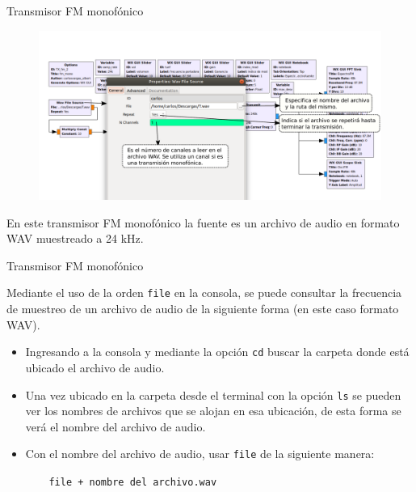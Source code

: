 \begin{frame}{Transmisor FM monofónico}

\begin{figure}[H]
\centering
\vspace{-3mm}
\includegraphics[width=\textwidth]{parte3/lab11/pdf/lab11_4.pdf}
\end{figure}

En este transmisor FM monofónico la fuente es un archivo de audio en formato WAV muestreado a 24 kHz.  

\end{frame}

\begin{frame}{Transmisor FM monofónico}

Mediante el uso de la orden \texttt{file} en la consola, se puede consultar la frecuencia de muestreo de un archivo de audio de la siguiente forma (en este caso formato WAV).

\begin{itemize}
    \item {Ingresando a la consola y mediante la opción \texttt{cd} buscar la carpeta donde está ubicado el archivo de audio.}
    \item {Una vez ubicado en la carpeta desde el terminal con la opción \texttt{ls} se pueden ver los nombres de archivos que se alojan en esa ubicación, de esta forma se verá el nombre del archivo de audio.}
    \item {Con el nombre del archivo de audio, usar \texttt{file} de la siguiente manera:  
}
    \begin{block}{}
    \texttt{
    \ \ \ file + nombre del archivo.wav}
    \end{block}
    
\end{itemize}{}

\end{frame}


